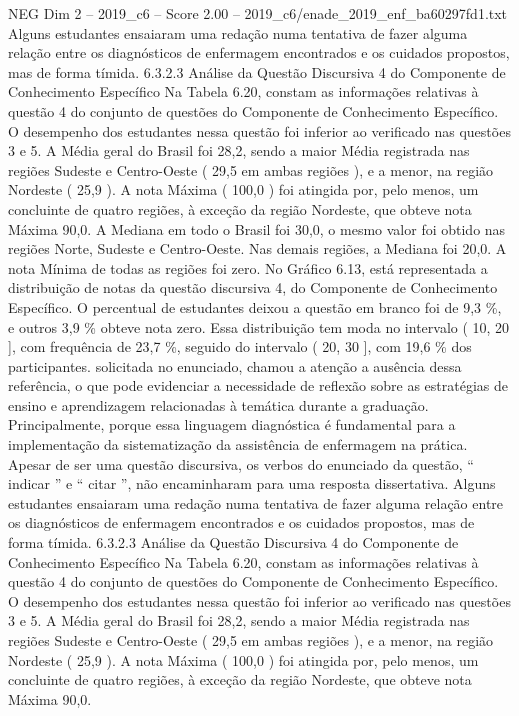\begin{textsample}{NEG Dim 2 – 2019\_c6 – Score 2.00 – 2019\_c6/enade\_2019\_enf\_ba60297fd1.txt}
Alguns estudantes ensaiaram uma redação numa tentativa de fazer alguma relação entre os diagnósticos de enfermagem encontrados e os cuidados propostos, mas de forma tímida. 6.3.2.3 Análise da Questão Discursiva 4 do Componente de Conhecimento Específico Na Tabela 6.20, constam as informações relativas à questão 4 do conjunto de questões do Componente de Conhecimento Específico.
O desempenho dos estudantes nessa questão foi inferior ao verificado nas questões 3 e 5.
A Média geral do Brasil foi 28,2, sendo a maior Média registrada nas regiões Sudeste e Centro-Oeste ( 29,5 em ambas regiões ), e a menor, na região Nordeste ( 25,9 ).
A nota Máxima ( 100,0 ) foi atingida por, pelo menos, um concluinte de quatro regiões, à exceção da região Nordeste, que obteve nota Máxima 90,0.
A Mediana em todo o Brasil foi 30,0, o mesmo valor foi obtido nas regiões Norte, Sudeste e Centro-Oeste.
Nas demais regiões, a Mediana foi 20,0.
A nota Mínima de todas as regiões foi zero.
No Gráfico 6.13, está representada a distribuição de notas da questão discursiva 4, do Componente de Conhecimento Específico.
O percentual de estudantes deixou a questão em branco foi de 9,3 \%, e outros 3,9 \% obteve nota zero.
Essa distribuição tem moda no intervalo ( 10, 20 ], com frequência de 23,7 \%, seguido do intervalo ( 20, 30 ], com 19,6 \% dos participantes. solicitada no enunciado, chamou a atenção a ausência dessa referência, o que pode evidenciar a necessidade de reflexão sobre as estratégias de ensino e aprendizagem relacionadas à temática durante a graduação.
Principalmente, porque essa linguagem diagnóstica é fundamental para a implementação da sistematização da assistência de enfermagem na prática.
Apesar de ser uma questão discursiva, os verbos do enunciado da questão, “ indicar ” e “ citar ”, não encaminharam para uma resposta dissertativa.
Alguns estudantes ensaiaram uma redação numa tentativa de fazer alguma relação entre os diagnósticos de enfermagem encontrados e os cuidados propostos, mas de forma tímida. 6.3.2.3 Análise da Questão Discursiva 4 do Componente de Conhecimento Específico Na Tabela 6.20, constam as informações relativas à questão 4 do conjunto de questões do Componente de Conhecimento Específico.
O desempenho dos estudantes nessa questão foi inferior ao verificado nas questões 3 e 5.
A Média geral do Brasil foi 28,2, sendo a maior Média registrada nas regiões Sudeste e Centro-Oeste ( 29,5 em ambas regiões ), e a menor, na região Nordeste ( 25,9 ).
A nota Máxima ( 100,0 ) foi atingida por, pelo menos, um concluinte de quatro regiões, à exceção da região Nordeste, que obteve nota Máxima 90,0.

\end{textsample}
